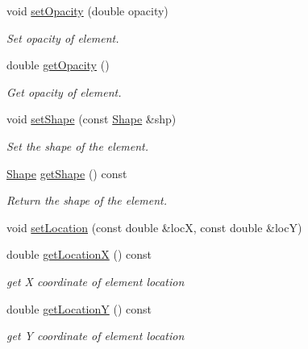 \begin{DoxyCompactItemize}
void \hyperlink{classbridges_1_1datastructure_1_1_element_visualizer_a03f0ba203affb77d4ba8d2f1a6b1eea0}{set\+Opacity} (double opacity)
\begin{DoxyCompactList}\small\item\em Set opacity of element. \end{DoxyCompactList}\item 
double \hyperlink{classbridges_1_1datastructure_1_1_element_visualizer_af403e841efd1dab3669fdda2fd927f99}{get\+Opacity} ()
\begin{DoxyCompactList}\small\item\em Get opacity of element. \end{DoxyCompactList}\item 
void \hyperlink{classbridges_1_1datastructure_1_1_element_visualizer_a316cccfc1e75ccbfdfe6d68da824b8b3}{set\+Shape} (const \hyperlink{namespacebridges_1_1datastructure_a3408f5f44d9c6062e5f3adb7e1bbb7f0}{Shape} \&shp)
\begin{DoxyCompactList}\small\item\em Set the shape of the element. \end{DoxyCompactList}\item 
\hyperlink{namespacebridges_1_1datastructure_a3408f5f44d9c6062e5f3adb7e1bbb7f0}{Shape} \hyperlink{classbridges_1_1datastructure_1_1_element_visualizer_a3b1dd1d61f43844142adce1f0bd03dcf}{get\+Shape} () const
\begin{DoxyCompactList}\small\item\em Return the shape of the element. \end{DoxyCompactList}\item 
void \hyperlink{classbridges_1_1datastructure_1_1_element_visualizer_ae980cb185ddb11ecd1cebeb4834734bf}{set\+Location} (const double \&locX, const double \&locY)
\item 
double \hyperlink{classbridges_1_1datastructure_1_1_element_visualizer_a8ee6ac3a3b03194d51cfbc08a1360b5d}{get\+LocationX} () const
\begin{DoxyCompactList}\small\item\em get X coordinate of element location \end{DoxyCompactList}\item 
double \hyperlink{classbridges_1_1datastructure_1_1_element_visualizer_a6012c9545e56e6210b6a6485873a5c92}{get\+LocationY} () const
\begin{DoxyCompactList}\small\item\em get Y coordinate of element location \end{DoxyCompactList}\end{DoxyCompactItemize}
